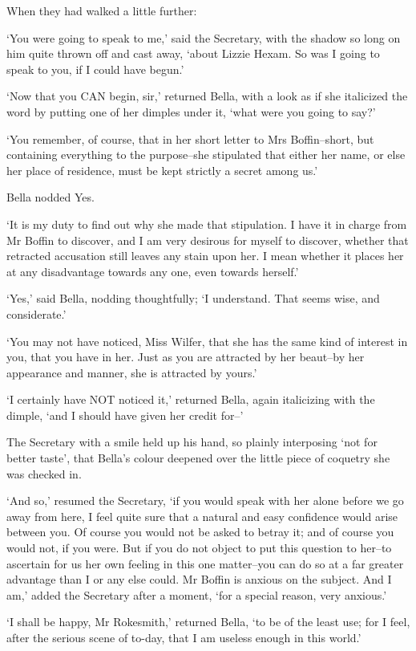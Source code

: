 When they had walked a little further:

‘You were going to speak to me,’ said the Secretary, with the shadow so
long on him quite thrown off and cast away, ‘about Lizzie Hexam. So was
I going to speak to you, if I could have begun.’

‘Now that you CAN begin, sir,’ returned Bella, with a look as if she
italicized the word by putting one of her dimples under it, ‘what were
you going to say?’

‘You remember, of course, that in her short letter to Mrs Boffin--short,
but containing everything to the purpose--she stipulated that either
her name, or else her place of residence, must be kept strictly a secret
among us.’

Bella nodded Yes.

‘It is my duty to find out why she made that stipulation. I have it in
charge from Mr Boffin to discover, and I am very desirous for myself to
discover, whether that retracted accusation still leaves any stain upon
her. I mean whether it places her at any disadvantage towards any one,
even towards herself.’

‘Yes,’ said Bella, nodding thoughtfully; ‘I understand. That seems wise,
and considerate.’

‘You may not have noticed, Miss Wilfer, that she has the same kind of
interest in you, that you have in her. Just as you are attracted by her
beaut--by her appearance and manner, she is attracted by yours.’

‘I certainly have NOT noticed it,’ returned Bella, again italicizing
with the dimple, ‘and I should have given her credit for--’

The Secretary with a smile held up his hand, so plainly interposing ‘not
for better taste’, that Bella’s colour deepened over the little piece of
coquetry she was checked in.

‘And so,’ resumed the Secretary, ‘if you would speak with her alone
before we go away from here, I feel quite sure that a natural and easy
confidence would arise between you. Of course you would not be asked to
betray it; and of course you would not, if you were. But if you do not
object to put this question to her--to ascertain for us her own feeling
in this one matter--you can do so at a far greater advantage than I or
any else could. Mr Boffin is anxious on the subject. And I am,’ added
the Secretary after a moment, ‘for a special reason, very anxious.’

‘I shall be happy, Mr Rokesmith,’ returned Bella, ‘to be of the least
use; for I feel, after the serious scene of to-day, that I am useless
enough in this world.’

